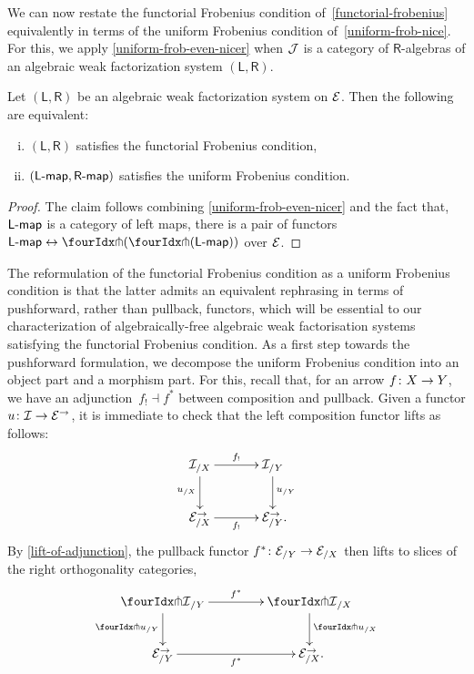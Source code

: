 \documentclass[reqno,10pt,a4paper,oneside,draft]{amsart}
\newcommand{\LL}{\mathsf{L}}
\newcommand{\RR}{\mathsf{R}}
\begin{document}
{{We can now restate the functorial Frobenius condition of~\cref{functorial-frobenius} equivalently in terms of
the uniform Frobenius condition of~\cref{uniform-frob-nice}. For this, we apply \cref{uniform-frob-even-nicer}
when $\cal{J}$ is a category of $\RR$-algebras of an algebraic weak factorization system $(\LL, \RR)$. 

\begin{proposition}
Let $(\mathsf{L}, \mathsf{R})$ be an algebraic weak factorization system on $\cal{E}$. Then the following are
equivalent:
\begin{enumerate}[(i)] 
\item $(\LL, \RR)$ satisfies the functorial Frobenius condition,
\item $(\pcoalg{\LL}, \palg{\RR})$ satisfies the uniform Frobenius condition.
\end{enumerate}
\end{proposition}

\begin{proof} The claim follows combining \cref{uniform-frob-even-nicer} and the fact that, $\pcoalg{\LL}$ is a category of left maps,
there is a pair of functors $\pcoalg{\LL} \leftrightarrow \liftl{(\liftr{(\pcoalg{\LL})})}$ over $\cal{E}$.
\end{proof}


The reformulation of the functorial Frobenius condition as a uniform Frobenius condition is that the latter admits an 
equivalent rephrasing in terms of pushforward, rather than pullback, functors, which will be essential to our characterization of algebraically-free
algebraic weak factorisation systems satisfying the functorial Frobenius condition. As a first step towards the pushforward formulation,
we decompose the uniform Frobenius condition into an object part and a morphism part. For this, recall that, for an arrow $f \co X \to Y$, we have an adjunction~$f_{!} \dashv f^*$ between composition and pullback. 
Given a functor $u \co \cal{I} \to \catE^\to$, it is immediate to check that the left composition functor lifts as follows:
\[
\xymatrix@C+1em{
  \cal{I}_{/X}
  \ar[r]^-{f_!}
  \ar[d]_{u_{/X}}
&
  \cal{I}_{/Y}
  \ar[d]^{u_{/Y}}
\\
  \calE_{/X}^\to
  \ar[r]_-{f_!}
&
  \calE_{/Y}^\to
\rlap{.}}
\]
By \cref{lift-of-adjunction}, the pullback functor $f^* \co \catE_{/Y} \to \catE_{/X}$ then lifts to slices of the right orthogonality categories,
\[
\xymatrix@C=1.5cm{
  \liftr{\cal{I}}_{/Y}
  \ar[d]_{{\liftr{u}}_{/Y}}
  \ar[r]^{f^*}
&
  \liftr{\cal{I}}_{/X}
  \ar[d]^{{\liftr{u}}_{/X}}
\\
  {\catE}_{/Y}^\to
  \ar[r]_{f^*}
&
  \catE_{/X}^\to
\rlap{.}}
\]






}}
\end{document}
